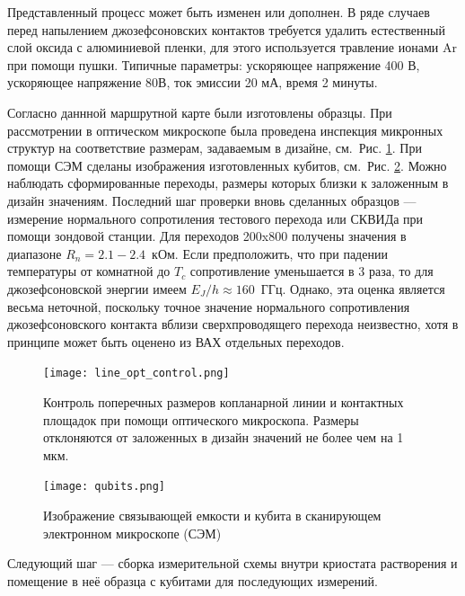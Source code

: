 Представленный процесс может быть изменен или дополнен. В ряде случаев перед напылением джозефсоновских контактов требуется удалить естественный слой оксида с алюминиевой пленки, для этого используется травление ионами Ar при помощи пушки. Типичные параметры: ускоряющее напряжение 400 В, ускоряющее напряжение 80В, ток эмиссии 20 мА, время 2 минуты.

Согласно даннной маршрутной карте были изготовлены образцы. При рассмотрении в оптическом микроскопе была проведена инспекция микронных структур на соответствие размерам, задаваемым в дизайне, см.~Рис. \ref{img: line_opt_control}.  При помощи СЭМ сделаны изображения изготовленных кубитов, см.~Рис. \ref{img: qubits_sem}. Можно наблюдать сформированные переходы, размеры которых близки к заложенным в дизайн значениям. Последний шаг проверки вновь сделанных образцов --- измерение нормального сопротиления тестового перехода или СКВИДа при помощи зондовой станции. Для переходов 200x800 получены значения в диапазоне $R_n=2.1-2.4$~кОм. Если предположить, что при падении температуры от комнатной до $T_c$ сопротивление уменьшается в 3 раза, то для джозефсоновской энергии имеем $E_J/h \approx 160$~ГГц. Однако, эта оценка является весьма неточной, поскольку точное значение нормального сопротивления джозефсоновского контакта вблизи сверхпроводящего перехода неизвестно, хотя в принципе может быть оценено из ВАХ отдельных переходов. 
\begin{figure}[htb]\center
	\texttt{[image: line\_opt\_control.png]} \hfill
	\caption[Контроль размеров микронных структур в оптическом микроскопе]{Контроль поперечных размеров копланарной линии  и контактных площадок при помощи оптического микроскопа. Размеры отклоняются от заложенных в дизайн значений не более чем на 1 мкм.}
	\label{img: line_opt_control}
\end{figure}

\begin{figure}[htb]\center
	\texttt{[image: qubits.png]} \hfill
	\caption{Изображение связывающей емкости и кубита в сканирующем электронном микроскопе (СЭМ)}  
	\label{img: qubits_sem}
\end{figure}
Следующий шаг --- сборка измерительной схемы внутри криостата растворения и помещение в неё образца с кубитами для последующих измерений. 
